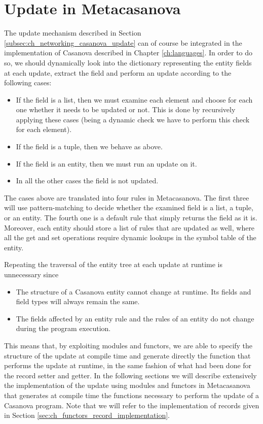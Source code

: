 \section{Update in Metacasanova}
\label{subsec:ch_networking_update_metacasanova}
The update mechanism described in Section \ref{subsec:ch_networking_casanova_update} can of course be integrated in the implementation of Casanova described in Chapter \ref{ch:languages}. In order to do so, we should dynamically look into the dictionary representing the entity fields at each update, extract the field and perform an update according to the following cases:

\begin{itemize}[noitemsep]
	\item If the field is a list, then we must examine each element and choose for each one whether it needs to be updated or not. This is done by recursively applying these cases (being a dynamic check we have to perform this check for each element).
	\item If the field is a tuple, then we behave as above.
	\item If the field is an entity, then we must run an update on it.
	\item In all the other cases the field is not updated.
\end{itemize}

\noindent
The cases above are translated into four rules in Metacasanova. The first three will use pattern-matching to decide whether the examined field is a list, a tuple, or an entity. The fourth one is a default rule that simply returns the field as it is. Moreover, each entity should store a list of rules that are updated as well, where all the get and set operations require dynamic lookups in the symbol table of the entity.

Repeating the traversal of the entity tree at each update at runtime is unnecessary since

\begin{itemize}[noitemsep]
	\item The structure of a Casanova entity cannot change at runtime. Its fields and field types will always remain the same.
	\item The fields affected by an entity rule and the rules of an entity do not change during the program execution.
\end{itemize}

\noindent
This means that, by exploiting modules and functors, we are able to specify the structure of the update at compile time and generate directly the function that performs the update at runtime, in the same fashion of what had been done for the record setter and getter. In the following sections we will describe extensively the implementation of the update using modules and functors in Metacasanova that generates at compile time the functions necessary to perform the update of a Casanova program. Note that we will refer to the implementation of records given in Section \ref{sec:ch_functors_record_implementation}.

